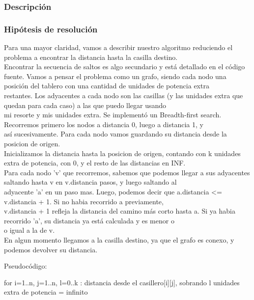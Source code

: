 \documentclass[11pt, a4paper, twoside]{article}
\begin{document}
{}

\subsubsection{Descripción} 

\subsubsection{Hipótesis de resolución}
Para una mayor claridad, vamos a describir nuestro algoritmo reduciendo el problema a encontrar la distancia hasta la casilla destino.\\
Encontrar la secuencia de saltos es algo secundario y está detallado en el código fuente.
Vamos a pensar el problema como un grafo, siendo cada nodo una posición del tablero con una cantidad de unidades de potencia extra \\
restantes. Los adyacentes a cada nodo son las casillas (y las unidades extra que quedan para cada caso) a las que puedo llegar usando \\
mi resorte y mis unidades extra. Se implementó un Breadth-first search. Recorremos primero los nodos a distancia 0, luego a distancia 1, y \\
así sucesivamente.
Para cada nodo vamos guardando su distancia desde la posicion de origen. \\
Inicializamos la distancia hasta la posicion de origen, contando con k unidades extra de potencia, con 0, y el resto de las distancias en INF.\\
Para cada nodo 'v' que recorremos, sabemos que podemos llegar a sus adyacentes saltando hasta v en v.distancia pasos, y luego saltando al \\
adyacente 'a' en un paso mas. Luego, podemos decir que a.distancia <= v.distancia + 1. Si no habia recorrido a previamente, \\
v.distancia + 1 refleja la distancia del camino más corto hasta a. Si ya habia recorrido 'a', su distancia ya está calculada y es menor o \\
o igual a la de v.\\
En algun momento llegamos a la casilla destino, ya que el grafo es conexo, y podemos devolver su distancia.


Pseudocódigo:

for i=1..n, j=1..n, l=0..k :
    distancia desde el casillero[i][j], sobrando l unidades extra de potencia = infinito
\end{document}
